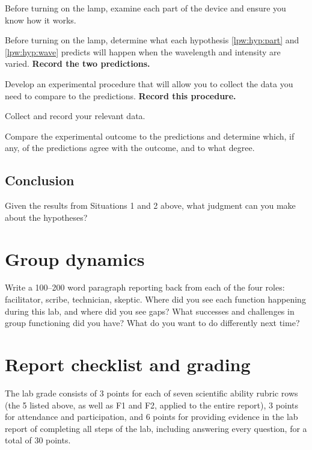 \begin{steps}
	
	\item Before turning on the lamp, examine each part of the device and ensure you know how it works.
	
	\item Before turning on the lamp, determine what each hypothesis \ref{lpw:hyp:part} and \ref{lpw:hyp:wave} predicts will happen when the wavelength and intensity are varied. \textbf{Record the two predictions.}
	
	\item Develop an experimental procedure that will allow you to collect the data you need to compare to the predictions. \textbf{Record this procedure.}
	
	\item Collect and record your relevant data.
	
	\item Compare the experimental outcome to the predictions and determine which, if any, of the predictions agree with the outcome, and to what degree.
\end{steps}


\subsection{Conclusion}

\begin{steps}
	\item Given the results from Situations 1 and 2 above, what judgment can you make about the hypotheses?
\end{steps}

\section{Group dynamics}

\begin{steps}
	\item Write a 100--200 word paragraph reporting back from each of the four roles: facilitator, scribe, technician, skeptic. Where did you see each function happening during this lab, and where did you see gaps? What successes and challenges in group functioning did you have? What do you want to do differently next time?
\end{steps}

\section{Report checklist and grading}

The lab grade consists of 3 points for each of seven scientific ability rubric rows (the 5 listed above, as well as F1 and F2, applied to the entire report), 3 points for attendance and participation, and 6 points for providing evidence in the lab report of completing all steps of the lab, including answering every question, for a total of 30 points.